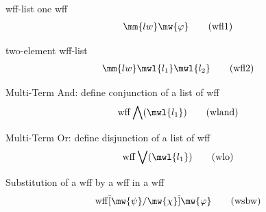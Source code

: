 \begin{metadefinition} wff-list one wff
\begin{align}
\mm{lw} \mw{\varphi}\label{eq:wfl1}\tag{wfl1}
\end{align}
\end{metadefinition}


\begin{metadefinition} two-element wff-list
\begin{align}
\mm{lw} \mwl{l_1} \mwl{l_2}\label{eq:wfl2}\tag{wfl2}
\end{align}
\end{metadefinition}


\begin{metadefinition} Multi-Term And:  define conjunction of a
list of wff
\begin{align}
{\rm wff} \bigwedge( \mwl{l_1} )\label{eq:wland}\tag{wland}
\end{align}
\end{metadefinition}


\begin{metadefinition} Multi-Term Or:  define disjunction of a list
of wff
\begin{align}
{\rm wff} \bigvee( \mwl{l_1} )\label{eq:wlo}\tag{wlo}
\end{align}
\end{metadefinition}


\begin{metadefinition} Substitution of a wff by a wff in a wff
\begin{align}
{\rm wff} \overline{[} \mw{\psi} / \mw{\chi} \overline{]}
    \mw{\varphi}\label{eq:wsbw}\tag{wsbw}
\end{align}
\end{metadefinition}


